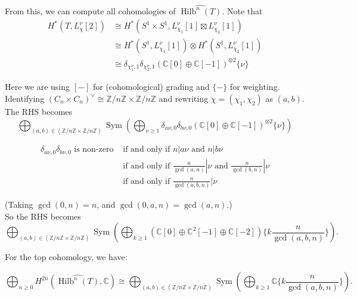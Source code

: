 \documentclass{article}
\theoremstyle{definition}
\DeclareMathOperator{\Hilb}{{\text{Hilb}}}
\DeclareMathOperator{\Sym}{{\text{Sym}}}
\begin{document}
From this, we can compute all cohomologies of $\widehat{\Hilb^n(T)}$. Note that 
\begin{align*}
    H^*(T,L^\nu_\chi[2])&\cong H^*(S^1\times S^1,L^\nu_{\chi_1}[1]\boxtimes L^\nu_{\chi_2}[1])\\
    &\cong H^*(S^1,L^\nu_{\chi_1}[1]) \otimes H^*(S^1,L^\nu_{\chi_2}[1])\\
    &\cong \delta_{\chi_1^\nu,1}\delta_{\chi_2^\nu,1}(\mathbb{C}[0]\oplus \mathbb{C}[-1])^{\otimes 2} \{\nu\}
\end{align*}

Here we are using $[-]$ for (cohomological) grading and $\{-\}$ for weighting.\\

Identifying $(C_n \times C_n)^\vee\cong \mathbb{Z}/n\mathbb{Z}\times \mathbb{Z}/n\mathbb{Z}$ and rewriting $\chi=(\chi_1,\chi_2)$ as $(a,b)$. The RHS becomes $$\bigoplus_{(a,b)\in (\mathbb{Z}/n\mathbb{Z}\times \mathbb{Z}/n\mathbb{Z})}\Sym(\bigoplus_{\nu\geq 1}\delta_{a\nu,0}\delta_{b\nu,0}(\mathbb{C}[0]\oplus \mathbb{C}[-1])^{\otimes 2}\{\nu\})$$


\begin{align*}
    \delta_{a\nu,0}\delta_{b\nu,0}\text{ is non-zero }&\text{if and only if }n|a\nu\text{ and }n|b\nu\\
    &\text{if and only if }\frac{n}{\gcd(a,n)}|\nu\text{ and }\frac{n}{\gcd(b,n)}|\nu\\
    &\text{if and only if }\frac{n}{\gcd(a,b,n)}|\nu
\end{align*}

(Taking $\gcd(0,n)=n$, and $\gcd(0,a,n)=\gcd(a,n)$.)\\

So the RHS becomes
$$\bigoplus_{(a,b)\in (\mathbb{Z}/n\mathbb{Z}\times \mathbb{Z}/n\mathbb{Z})}\Sym(\bigoplus_{k\geq 1}(\mathbb{C}[0]\oplus \mathbb{C}^2[-1]\oplus\mathbb{C}[-2])\{k\frac{n}{\gcd(a,b,n)}\}).$$








For the top cohomology, we have:

$$\bigoplus_{n\geq 0}H^{2n}(\widehat{\Hilb^n(T)},\mathbb{C})\cong \bigoplus_{(a,b)\in (\mathbb{Z}/n\mathbb{Z}\times \mathbb{Z}/n\mathbb{Z})}\Sym(\bigoplus_{k\geq 1}\mathbb{C}\{k\frac{n}{\gcd(a,b,n)}\}).$$
\end{document}
